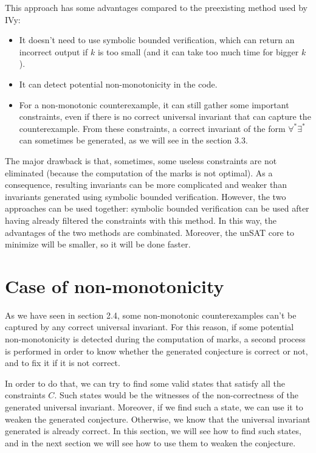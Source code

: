 \documentclass[11pt,a4paper,oldfontcommands,openany]{memoir}
\begin{document}
    This approach has some advantages compared to the preexisting method used by IVy:
    \begin{itemize}
        \item It doesn't need to use symbolic bounded verification, which can return an incorrect output if \(k\) is too small (and it can take too much time for bigger \(k\)).
        \item It can detect potential non-monotonicity in the code.
        \item For a non-monotonic counterexample, it can still gather some important constraints, even if there is no correct universal invariant that can capture the counterexample.
        From these constraints, a correct invariant of the form \(\forall^*\exists^*\) can sometimes be generated, as we will see in the section 3.3.
    \end{itemize}

    The major drawback is that, sometimes, some useless constraints are not eliminated (because the computation of the marks is not optimal).
    As a consequence, resulting invariants can be more complicated and weaker than invariants generated using symbolic bounded verification.
    However, the two approaches can be used together: symbolic bounded verification can be used after having already filtered the constraints with this method.
    In this way, the advantages of the two methods are combinated. Moreover, the unSAT core to minimize will be smaller, so it will be done faster.

    \section{Case of non-monotonicity}

    As we have seen in section 2.4, some non-monotonic counterexamples can't be captured by any correct universal invariant.
    For this reason, if some potential non-monotonicity is detected during the computation of marks,
    a second process is performed in order to know whether the generated conjecture is correct or not, and to fix it if it is not correct.
    
    In order to do that, we can try to find some valid states that satisfy all the constraints \(C\).
    Such states would be the witnesses of the non-correctness of the generated universal invariant.
    Moreover, if we find such a state, we can use it to weaken the generated conjecture.
    Otherwise, we know that the universal invariant generated is already correct.
    In this section, we will see how to find such states, and in the next section we will see how to use them to weaken the conjecture.
\end{document}

